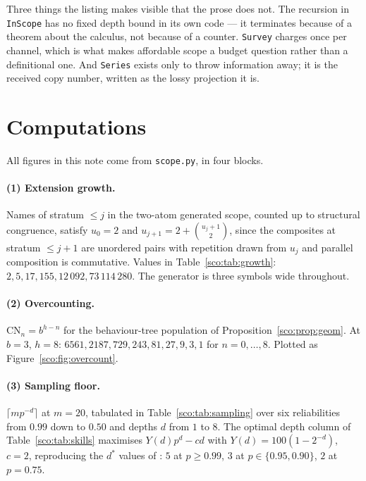 \documentclass[11pt]{article}
\theoremstyle{plain}
\theoremstyle{definition}
\theoremstyle{remark}
\newcommand{\CN}{\mathrm{CN}}
\begin{document}
\noindent
Three things the listing makes visible that the prose does not. The
recursion in \texttt{InScope} has no fixed depth bound in its own code ---
it terminates because of a theorem about the calculus, not because of a
counter. \texttt{Survey} charges once per channel, which is what makes
affordable scope a budget question rather than a definitional one. And
\texttt{Series} exists only to throw information away; it is the received
copy number, written as the lossy projection it is.

\section{Computations}\label{sco:app:num}

All figures in this note come from \texttt{scope.py}, in four blocks.

\paragraph{(1) Extension growth.}
Names of stratum $\le j$ in the two-atom generated scope, counted up to
structural congruence, satisfy $u_0 = 2$ and
$u_{j+1} = 2 + \binom{u_j + 1}{2}$, since the composites at stratum
$\le j+1$ are unordered pairs with repetition drawn from $u_j$ and
parallel composition is commutative. Values in
Table~\ref{sco:tab:growth}: $2, 5, 17, 155, 12\,092, 73\,114\,280$. The
generator is three symbols wide throughout.

\paragraph{(2) Overcounting.}
$\CN_n = b^{h-n}$ for the behaviour-tree population of
Proposition~\ref{sco:prop:geom}. At $b=3$, $h=8$: $6561, 2187, 729, 243,
81, 27, 9, 3, 1$ for $n = 0, \dots, 8$. Plotted as
Figure~\ref{sco:fig:overcount}.

\paragraph{(3) Sampling floor.}
$\lceil m p^{-d} \rceil$ at $m=20$, tabulated in
Table~\ref{sco:tab:sampling} over six reliabilities from $0.99$ down to
$0.50$ and depths $d$ from $1$ to $8$.
The optimal depth column of
Table~\ref{sco:tab:skills} maximises $Y(d)p^d - cd$ with
$Y(d) = 100(1-2^{-d})$, $c=2$, reproducing the $d^\ast$ values of
\cite[App.~B]{engine}: $5$ at $p \ge 0.99$, $3$ at $p \in
\{0.95, 0.90\}$, $2$ at $p = 0.75$.
\end{document}
